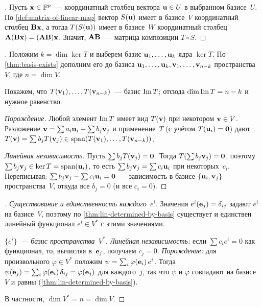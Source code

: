 \begin{proof}[]
Пусть $\mathbf{x} \in \mathbb{F}^p$~--- координатный столбец вектора
$\mathbf{u} \in U$ в выбранном базисе~$U$. По
\cref{def:matrix-of-linear-map} вектор $S(\mathbf{u})$ имеет в базисе~$V$
координатный столбец $\mathbf{B}\mathbf{x}$, а тогда $T(S(\mathbf{u}))$ имеет
в базисе~$W$ координатный столбец
$\mathbf{A}(\mathbf{B}\mathbf{x}) = (\mathbf{A}\mathbf{B})\mathbf{x}$. Значит,
$\mathbf{A}\mathbf{B}$~--- матрица композиции $T \circ S$.
\end{proof}

\begin{proof}[]
Положим $k = \dim \ker T$ и выберем базис
$\mathbf{u}_1, \dots, \mathbf{u}_k$ ядра $\ker T$. По
\cref{thm:basis-exists} дополним его до базиса
$\mathbf{u}_1, \dots, \mathbf{u}_k, \mathbf{v}_1, \dots, \mathbf{v}_{n-k}$
пространства~$V$, где $n = \dim V$.

Покажем, что $T(\mathbf{v}_1), \dots, T(\mathbf{v}_{n-k})$~--- базис $\operatorname{Im} T$;
отсюда $\dim \operatorname{Im} T = n - k$ и нужное равенство.

\emph{Порождение.} Любой элемент $\operatorname{Im} T$ имеет вид $T(\mathbf{v})$ при
некотором $\mathbf{v} \in V$. Разложение
$\mathbf{v} = \sum a_i \mathbf{u}_i + \sum b_j \mathbf{v}_j$ и применение~$T$
(с учётом $T(\mathbf{u}_i) = \mathbf{0}$) дают
$T(\mathbf{v}) = \sum b_j T(\mathbf{v}_j) \in \operatorname{span}(T(\mathbf{v}_1), \dots, T(\mathbf{v}_{n-k}))$.

\emph{Линейная независимость.} Пусть $\sum b_j T(\mathbf{v}_j) = \mathbf{0}$.
Тогда $T(\sum b_j \mathbf{v}_j) = \mathbf{0}$, поэтому
$\sum b_j \mathbf{v}_j \in \ker T = \operatorname{span}(\mathbf{u}_i)$, то есть
$\sum b_j \mathbf{v}_j = \sum c_i \mathbf{u}_i$ при некоторых~$c_i$.
Переписывая: $\sum b_j \mathbf{v}_j - \sum c_i \mathbf{u}_i = \mathbf{0}$~---
зависимость в базисе $\{\mathbf{u}_i, \mathbf{v}_j\}$ пространства~$V$,
откуда все $b_j = 0$ (и все $c_i = 0$).
\end{proof}

\begin{proof}[]
\emph{Существование и единственность каждого~$e^i$.} Значения
$e^i(\mathbf{e}_j) = \delta_{ij}$ задают $e^i$ на базисе~$V$, поэтому по
\cref{thm:lin-determined-by-basis} существует и единствен линейный
функционал $e^i \in V^{*}$ с этими значениями.

\emph{$\{e^i\}$~--- базис пространства~$V^{*}$.}
\textit{Линейная независимость:} если $\sum c_i e^i = 0$ как функционал,
то, вычисляя в~$\mathbf{e}_j$, получаем $c_j = 0$.
\textit{Порождение:} для произвольного $\varphi \in V^{*}$ положим
$\psi = \sum_i \varphi(\mathbf{e}_i)\, e^i$. Тогда
$\psi(\mathbf{e}_j) = \sum_i \varphi(\mathbf{e}_i)\, \delta_{ij} = \varphi(\mathbf{e}_j)$
для каждого~$j$, так что $\psi$ и $\varphi$ совпадают на базисе~$V$ и
равны (\cref{thm:lin-determined-by-basis}).

В частности, $\dim V^{*} = n = \dim V$.
\end{proof}

